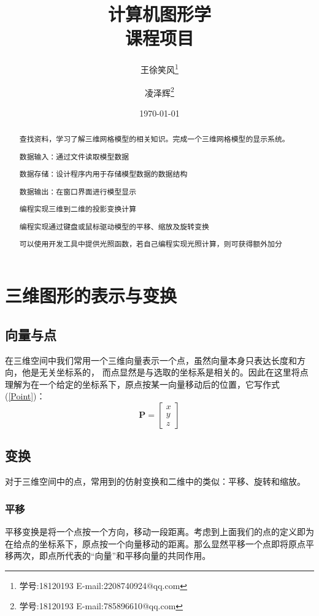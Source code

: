 \documentclass[12pt,oneside,a4paper]{ctexart}
\begin{document}
\title{计算机图形学 \\ 课程项目}
\author{ 王徐笑风\thanks{学号:18120193 E-mail:2208740924@qq.com}
	\and 凌泽辉\thanks{学号:18120193 E-mail:785896610@qq.com}}
\date{\today}
\maketitle
\newpage
\tableofcontents
\newpage
\begin{abstract}
	查找资料，学习了解三维网格模型的相关知识。完成一个三维网格模型的显示系统。

	数据输入：通过文件读取模型数据

	数据存储：设计程序内用于存储模型数据的数据结构

	数据输出：在窗口界面进行模型显示

	编程实现三维到二维的投影变换计算

	编程实现通过键盘或鼠标驱动模型的平移、缩放及旋转变换

	可以使用开发工具中提供光照函数，若自己编程实现光照计算，则可获得额外加分
\end{abstract}

\section{三维图形的表示与变换}
\subsection{向量与点}
在三维空间中我们常用一个三维向量表示一个点，虽然向量本身只表达长度和方向，他是无关坐标系的，
而点显然是与选取的坐标系是相关的。因此在这里将点理解为在一个给定的坐标系下，原点按某一向量移动后的位置，它写作式(\ref{Point})：
\begin{equation}
	\mathbf{P} = \begin{bmatrix}
		x \\
		y \\
		z
	\end{bmatrix}
	\label{Point}
\end{equation}
\subsection{变换}
对于三维空间中的点，常用到的仿射变换和二维中的类似：平移、旋转和缩放。
\subsubsection{平移}
平移变换是将一个点按一个方向，移动一段距离。考虑到上面我们的点的定义即为在给点的坐标系下，原点按一个向量移动的距离。那么显然平移一个点即将原点平移两次，即点所代表的“向量”和平移向量的共同作用。
\end{document}
